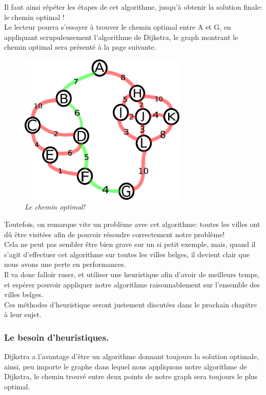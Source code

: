 \documentclass[a4paper, 12pt]{article}
\numberwithin{equation}{subsection}
\begin{document}
Il faut ainsi répéter les étapes de cet algorithme, jusqu'à obtenir la solution finale: le chemin optimal ! \\

Le lecteur pourra s'essayer à trouver le chemin optimal entre A et G, en appliquant scrupuleusement l'algorithme de Dijkstra, le graph montrant le chemin optimal sera présenté à la page suivante.
\begin{figure}[!hbt]
  \centering
  \includegraphics[width=8.0cm]{imgs/solved.png}
  \caption{{\em Le chemin optimal!}}
\end{figure}
Toutefois, on remarque vite un problème avec cet algorithme: toutes les villes ont dû être visitées afin de pouvoir résoudre correctement notre problème! \\

Cela ne peut pas sembler être bien grave sur un si petit exemple, mais, quand il s'agit d'effectuer cet algorithme sur toutes les villes belges, il devient clair que nous avons une perte en performances.\\

Il va donc falloir ruser, et utiliser une heuristique afin d'avoir de meilleurs temps, et espérer pouvoir appliquer notre algorithme raisonnablement sur l'ensemble des villes belges. \\

Ces méthodes d'heuristique seront justement discutées dans le prochain chapitre à leur sujet. \\
\subsubsection{Le besoin d'heuristiques.}

Dijkstra a l'avantage d'être un algorithme donnant toujours la solution optimale, ainsi, peu importe le graphe dans lequel nous appliquons notre algorithme de Dijkstra, le chemin trouvé entre deux points de notre graph sera toujours le plus optimal. \\
\end{document}
